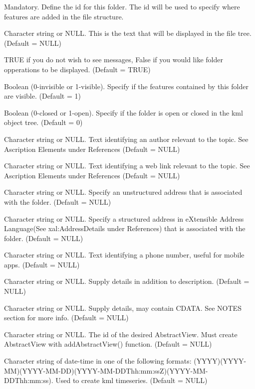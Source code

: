 \documentclass[a4paper]{book}
\begin{document}
%
\begin{Arguments}
\begin{ldescription}

\item[\code{fid}] 
Mandatory. Define the id for this folder. The id will be used to specify where features are added in the file structure.


\item[\code{name}] Character string or NULL. This is the text that will be displayed in the file tree. (Default = NULL) 
\item[\code{silent}] TRUE if you do not wish to see messages, False if you would like folder opperations to be displayed. (Default = TRUE) 
\item[\code{visibility}] Boolean (0-invisible or 1-visible). Specify if the features contained by this folder are visible. (Default = 1)
\item[\code{open}]  Boolean (0-closed or 1-open). Specify if the folder is open or closed in the kml object tree. (Default = 0)
\item[\code{atomauthor}]  Character string or NULL. Text identifying an author relevant to the topic. See Ascription Elements under References (Default = NULL) 
\item[\code{atomlinkhref}] Character string or NULL. Text identifying a web link relevant to the topic. See Ascription Elements under References (Default = NULL) 
\item[\code{address}] Character string or NULL. Specify an unstructured address that is associated with the folder. (Default = NULL) 
\item[\code{xalAddressDetails}] Character string or NULL. Specify a structured address in eXtensible Address Language(See xal:AddressDetails under References) that is associated with the folder. (Default = NULL) 
\item[\code{phoneNumber}]  Character string or NULL. Text identifying a phone number, useful for mobile apps. (Default = NULL) 
\item[\code{Snippet}] Character string or NULL. Supply details in addition to description. (Default = NULL)
\item[\code{description}] Character string or NULL. Supply details, may contain CDATA. See NOTES section for more info. (Default = NULL)
\item[\code{AbstractView}] Character string or NULL. The id of the desired AbstractView. Must create AbstractView with addAbstractView() function. (Default = NULL)
\item[\code{TimeStamp}]  Character string of date-time in one of the following formats: (YYYY)(YYYY-MM)(YYYY-MM-DD)(YYYY-MM-DDThh:mm:ssZ)(YYYY-MM-DDThh:mm:ss). Used to create kml timeseries. (Default = NULL)

\end{ldescription}
\end{Arguments}
\end{document}
